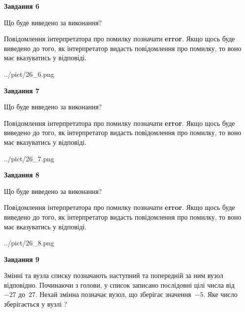 \documentclass[12pt, ukrainian]{article}
\begin{document}
{\begin {large}
{\begin {center}\textbf{Завдання 6}\end {center}}\par
Що буде виведено за виконання?

Повідомлення інтерпретатора про помилку позначати \textbf{error}.
Якщо щось буде виведено до того, як інтерпретатор видасть повідомлення про помилку, 
то воно має вказуватись у відповіді. \par


\begin{center}
	{../pict/26_6.png}
\end{center}
\newpage

{\begin {center}\textbf{Завдання 7}\end {center}}\par
Що буде виведено за виконання?

Повідомлення інтерпретатора про помилку позначати \textbf{error}.
Якщо щось буде виведено до того, як інтерпретатор видасть повідомлення про помилку, 
то воно має вказуватись у відповіді. \par


\begin{center}
	{../pict/26_7.png}
\end{center}
\newpage

{\begin {center}\textbf{Завдання 8}\end {center}}\par
Що буде виведено за виконання?

Повідомлення інтерпретатора про помилку позначати \textbf{error}.
Якщо щось буде виведено до того, як інтерпретатор видасть повідомлення про помилку, 
то воно має вказуватись у відповіді. \par


\begin{center}
	{../pict/26_8.png}
\end{center}
\newpage

{\begin {center}\textbf{Завдання 9}\end {center}}\par
Змінні  та  вузла списку позначають наступний та попередній за ним вузол відповідно. Починаючи з голови, у список записано послідовні цілі числа від~$-27$ до~$27$. Нехай змінна  позначає вузол, що зберігає значення~$-5$.
Яке число зберігається у вузлі  ?\par
\newpage


\end{large}}
\end{document}

